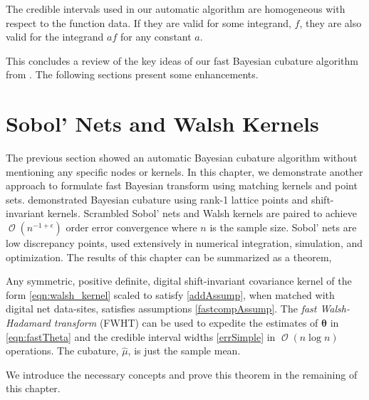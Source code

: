 \documentclass[graybox,footinfo]{svmult}
\DeclareMathOperator{\Order}{{\mathcal O}}
\newcommand{\bm}[1]{\boldsymbol{#1}}
\newcommand{\vtheta}{{\bm{\theta}}}
\newcommand{\hmu}{\widehat{\mu}}
\begin{document}
The credible intervals used in our automatic algorithm are homogeneous with respect to the function data.  If they are valid for some integrand, $f$, they are also valid for the integrand $a f$ for any constant $a$.  



This concludes a review of the key ideas of our fast Bayesian cubature algorithm from \cite{RatHic19a}.  The following sections present some enhancements.







\pagebreak





 

\section{Sobol' Nets and Walsh Kernels}
\label{sec:sobol_walsh}



The previous section showed an automatic Bayesian cubature algorithm without mentioning any specific nodes or kernels. 
In this chapter, we demonstrate another approach to formulate fast Bayesian transform using matching kernels and point sets. 
\cite{RatHic19a} demonstrated Bayesian cubature using rank-1 lattice points and shift-invariant kernels.
Scrambled Sobol' nets and Walsh kernels are paired to achieve $\Order(n^{-1 + \epsilon})$ order error convergence where $n$ is the sample size. 
Sobol' nets \cite{Sob67} are low discrepancy points, used extensively in numerical integration, simulation, and optimization. 
The results of this chapter can be summarized as a theorem,



\begin{theorem}
	Any symmetric, positive definite, digital shift-invariant covariance kernel of the form \eqref{eqn:walsh_kernel} scaled to satisfy \eqref{addAssump}, when matched with digital net data-sites, satisfies assumptions \eqref{fastcompAssump}.  The \emph{fast Walsh-Hadamard transform} (FWHT) can be used to expedite the estimates of $\vtheta$ in \eqref{eqn:fastTheta} and the credible interval widths \eqref{errSimple} in $\Order(n \log n)$ operations. The cubature, $\hmu$, is just the sample mean.
\end{theorem}
We introduce the necessary concepts and prove this theorem in the remaining of this chapter.
\end{document}
